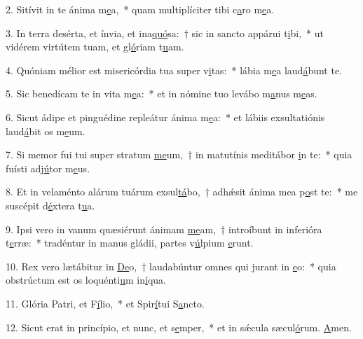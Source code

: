 2. Sitívit in te ánima m\uline{e}a,~* quam multiplíciter tibi c\uline{a}ro m\uline{e}a.\par 
3. In terra desérta, et ínvia, et ina\uline{quó}sa:~† sic in sancto appárui t\uline{i}bi,~* ut vidérem virtútem tuam, et gl\uline{ó}riam t\uline{u}am.\par 
4. Quóniam mélior est misericórdia tua super v\uline{i}tas:~* lábia m\uline{e}a laud\uline{á}bunt te.\par 
5. Sic benedícam te in vita m\uline{e}a:~* et in nómine tuo levábo m\uline{a}nus m\uline{e}as.\par 
6. Sicut ádipe et pinguédine repleátur ánima m\uline{e}a:~* et lábiis exsultatiónis laud\uline{á}bit os m\uline{e}um.\par 
7. Si memor fui tui super stratum \uline{me}um,~† in matutínis meditábor \uline{i}n te:~* quia fuísti adj\uline{ú}tor m\uline{e}us.\par 
8. Et in velaménto alárum tuárum exsul\uline{tá}bo,~† adhǽsit ánima mea p\uline{o}st te:~* me suscépit d\uline{é}xtera t\uline{u}a.\par 
9. Ipsi vero in vanum quæsiérunt ánimam \uline{me}am,~† introíbunt in inferióra t\uline{e}rræ:~* tradéntur in manus gládii, partes v\uline{ú}lpium \uline{e}runt.\par 
10. Rex vero lætábitur in \uline{De}o,~† laudabúntur omnes qui jurant in \uline{e}o:~* quia obstrúctum est os loquénti\uline{u}m in\uline{í}qua.\par 
11. Glória Patri, et F\uline{í}lio,~* et Spir\uline{í}tui S\uline{a}ncto.\par 
12. Sicut erat in princípio, et nunc, et s\uline{e}mper,~* et in sǽcula sæcul\uline{ó}rum. \uline{A}men.\par 

